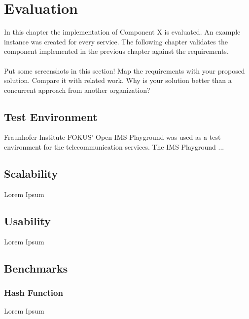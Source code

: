 \chapter{Evaluation\label{cha:chapter6}}

In this chapter the implementation of Component X is evaluated. An example instance was created for every service. The following chapter validates the component implemented in the previous chapter against the requirements.
\\
\\
Put some screenshots in this section! Map the requirements with your proposed solution. Compare it with related work. Why is your solution better than a concurrent approach from another organization?

\section{Test Environment\label{sec:testenvir}}

Fraunhofer Institute FOKUS' Open IMS Playground was used as a test environment for the telecommunication services. The IMS Playground ...

\section{Scalability\label{sec:scal}}

Lorem Ipsum

\section{Usability\label{sec:usab}}

Lorem Ipsum

\section{Benchmarks\label{sec:benchmarks}}

\subsection{Hash Function\label{subsec:6_hashfunc}}

Lorem Ipsum